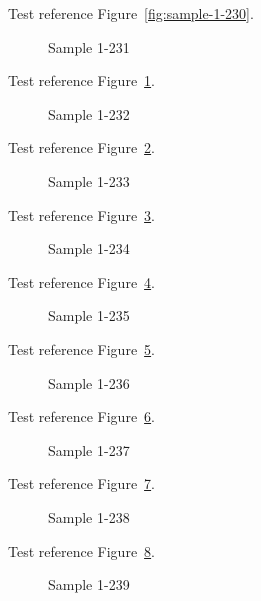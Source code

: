 Test reference Figure~\ref{fig:sample-1-230}.

\begin{figure}[tbhp]
\caption{Sample 1-231}
\label{fig:sample-1-231}
\end{figure}

Test reference Figure~\ref{fig:sample-1-231}.

\begin{figure}[tbhp]
\caption{Sample 1-232}
\label{fig:sample-1-232}
\end{figure}

Test reference Figure~\ref{fig:sample-1-232}.

\begin{figure}[tbhp]
\caption{Sample 1-233}
\label{fig:sample-1-233}
\end{figure}

Test reference Figure~\ref{fig:sample-1-233}.

\begin{figure}[tbhp]
\caption{Sample 1-234}
\label{fig:sample-1-234}
\end{figure}

Test reference Figure~\ref{fig:sample-1-234}.

\begin{figure}[tbhp]
\caption{Sample 1-235}
\label{fig:sample-1-235}
\end{figure}

Test reference Figure~\ref{fig:sample-1-235}.

\begin{figure}[tbhp]
\caption{Sample 1-236}
\label{fig:sample-1-236}
\end{figure}

Test reference Figure~\ref{fig:sample-1-236}.

\begin{figure}[tbhp]
\caption{Sample 1-237}
\label{fig:sample-1-237}
\end{figure}

Test reference Figure~\ref{fig:sample-1-237}.

\begin{figure}[tbhp]
\caption{Sample 1-238}
\label{fig:sample-1-238}
\end{figure}

Test reference Figure~\ref{fig:sample-1-238}.

\begin{figure}[tbhp]
\caption{Sample 1-239}
\label{fig:sample-1-239}
\end{figure}

